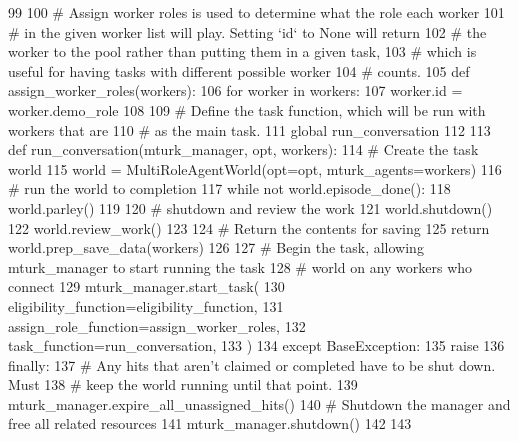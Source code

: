 \begin{DoxyCode}
99 
100         \textcolor{comment}{# Assign worker roles is used to determine what the role each worker}
101         \textcolor{comment}{# in the given worker list will play. Setting `id` to None will return}
102         \textcolor{comment}{# the worker to the pool rather than putting them in a given task,}
103         \textcolor{comment}{# which is useful for having tasks with different possible worker}
104         \textcolor{comment}{# counts.}
105         \textcolor{keyword}{def }assign\_worker\_roles(workers):
106             \textcolor{keywordflow}{for} worker \textcolor{keywordflow}{in} workers:
107                 worker.id = worker.demo\_role
108 
109         \textcolor{comment}{# Define the task function, which will be run with workers that are}
110         \textcolor{comment}{# as the main task.}
111         \textcolor{keyword}{global} run\_conversation
112 
113         \textcolor{keyword}{def }run\_conversation(mturk\_manager, opt, workers):
114             \textcolor{comment}{# Create the task world}
115             world = MultiRoleAgentWorld(opt=opt, mturk\_agents=workers)
116             \textcolor{comment}{# run the world to completion}
117             \textcolor{keywordflow}{while} \textcolor{keywordflow}{not} world.episode\_done():
118                 world.parley()
119 
120             \textcolor{comment}{# shutdown and review the work}
121             world.shutdown()
122             world.review\_work()
123 
124             \textcolor{comment}{# Return the contents for saving}
125             \textcolor{keywordflow}{return} world.prep\_save\_data(workers)
126 
127         \textcolor{comment}{# Begin the task, allowing mturk\_manager to start running the task}
128         \textcolor{comment}{# world on any workers who connect}
129         mturk\_manager.start\_task(
130             eligibility\_function=eligibility\_function,
131             assign\_role\_function=assign\_worker\_roles,
132             task\_function=run\_conversation,
133         )
134     \textcolor{keywordflow}{except} BaseException:
135         \textcolor{keywordflow}{raise}
136     \textcolor{keywordflow}{finally}:
137         \textcolor{comment}{# Any hits that aren't claimed or completed have to be shut down. Must}
138         \textcolor{comment}{# keep the world running until that point.}
139         mturk\_manager.expire\_all\_unassigned\_hits()
140         \textcolor{comment}{# Shutdown the manager and free all related resources}
141         mturk\_manager.shutdown()
142 
143 
\end{DoxyCode}
